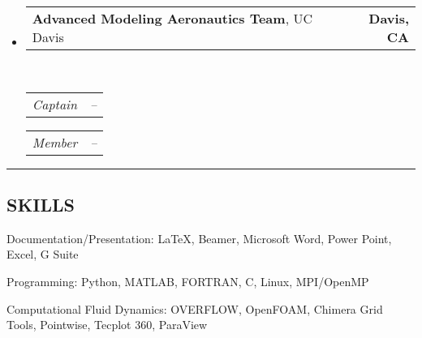 \documentclass[10pt,letterpaper,MMMyyyy,nonstop]{simpleresumecv}
\makeatletter
\newenvironment{indentsection}[1]%
{\begin{list}{}%
    {\setlength{\leftmargin}{#1}}%
    \item[]%
}
{\end{list}}
\newcommand{\headerrow}[2]
{\begin{tabular*}{\linewidth}{l@{\extracolsep{\fill}}r}
    #1 &
    #2 \\
\end{tabular*}}
\newcommand{\CPP}
{C\nolinebreak[4]\hspace{-.05em}\raisebox{.22ex}{\footnotesize\bf ++}}
\makeatother
\begin{document}
\begin{itemize}
    \item
        \headerrow
        {\textbf{Advanced Modeling Aeronautics Team}, UC Davis}
        {\textbf{Davis, CA}}
        \\
        \headerrow
        {\emph{Captain}}
        {\emph{\DatestampY{2012} -- \DatestampY{2013}}}

        \headerrow
        {\emph{Member}}
        {\emph{\DatestampY{2011} -- \DatestampY{2012}}}



\end{itemize}







\hrule
\vspace{-0.4em}
\subsection*{SKILLS}

\begin{indentsection}{\parindent}
    \begin{description*}
        \item[Documentation/Presentation:]
        {\LaTeX}, Beamer, Microsoft Word, Power Point, Excel, G Suite
        \item[Programming:]
        Python, MATLAB, FORTRAN, \CPP, Linux, MPI/OpenMP
        \item[Computational Fluid Dynamics:]
        OVERFLOW, OpenFOAM, Chimera Grid Tools, Pointwise, Tecplot 360, ParaView
    \end{description*}
\end{indentsection}
\end{document}
